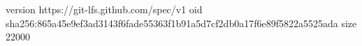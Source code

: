 version https://git-lfs.github.com/spec/v1
oid sha256:865a45e9ef3ad3143f6fade55363f1b91a5d7cf2db0a17f6e89f5822a5525ada
size 22000
